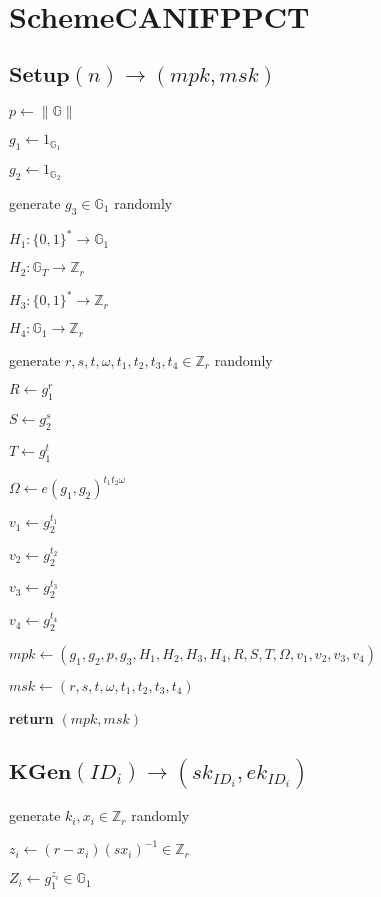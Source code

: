 \documentclass[a4paper]{article}
\begin{document}
\section{SchemeCANIFPPCT}

\subsection{$\textbf{Setup}(n) \rightarrow (\textit{mpk}, \textit{msk})$}

$p \gets \|\mathbb{G}\|$

$g_1 \gets 1_{\mathbb{G}_1}$

$g_2 \gets 1_{\mathbb{G}_2}$

generate $g_3 \in \mathbb{G}_1$ randomly

$H_1: \{0, 1\}^* \rightarrow \mathbb{G}_1$

$H_2: \mathbb{G}_T \rightarrow \mathbb{Z}_r$

$H_3: \{0, 1\}^* \rightarrow \mathbb{Z}_r$

$H_4: \mathbb{G}_1 \rightarrow \mathbb{Z}_r$

generate $r, s, t, \omega, t_1, t_2, t_3, t_4 \in \mathbb{Z}_r$ randomly

$R \gets g_1^r$

$S \gets g_2^s$

$T \gets g_1^t$

$\Omega \gets e(g_1, g_2)^{t_1 t_2 \omega}$

$v_1 \gets g_2^{t_1}$

$v_2 \gets g_2^{t_2}$

$v_3 \gets g_2^{t_3}$

$v_4 \gets g_2^{t_4}$

$ \textit{mpk} \gets (g_1, g_2, p, g_3, H_1, H_2, H_3, H_4, R, S, T, \Omega, v_1, v_2, v_3, v_4)$

$\textit{msk} \gets (r, s, t, \omega, t_1, t_2, t_3, t_4)$

\textbf{return} $(\textit{mpk}, \textit{msk})$

\subsection{$\textbf{KGen}(\textit{ID}_i) \rightarrow (\textit{sk}_{\textit{ID}_i}, \textit{ek}_{\textit{ID}_i})$}

generate $k_i, x_i \in \mathbb{Z}_r$ randomly

$z_i \gets (r - x_i)(s x_i)^{-1} \in \mathbb{Z}_r$

$Z_i \gets g_1^{z_i} \in \mathbb{G}_1$
\end{document}
